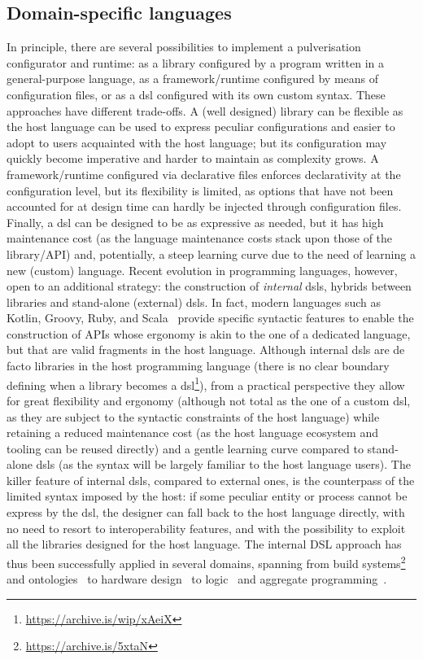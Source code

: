 \documentclass[conference]{IEEEtran}
\begin{document}
\subsection{Domain-specific languages}

In principle, there are several possibilities to implement a pulverisation configurator and runtime:
as a library
configured by a program written in a general-purpose language,
as a framework/runtime configured by means of configuration files,
or as a \ac{dsl} configured with its own custom syntax.
%
These approaches have different trade-offs.
%
A (well designed) library can be flexible as the host language can be used to express peculiar configurations
and easier to adopt to users acquainted with the host language;
but its configuration may quickly become imperative and harder to maintain as complexity grows.
%
A framework/runtime configured via declarative files enforces declarativity at the configuration level,
but its flexibility is limited,
as options that have not been accounted for at design time can hardly be injected through configuration files.
%
Finally, a \ac{dsl} can be designed to be as expressive as needed,
but it has high maintenance cost (as the language maintenance costs stack upon those of the library/API) and, potentially,
a steep learning curve due to the need of learning a new (custom) language.
%
Recent evolution in programming languages,
however,
open to an additional strategy:
the construction of \emph{internal} \acp{dsl},
hybrids between libraries and stand-alone (external) \acp{dsl}.
%
In fact, modern languages such as Kotlin, Groovy, Ruby, and Scala~\cite{Riti2018}
provide specific syntactic features to enable the construction of APIs whose ergonomy is akin to the one of a dedicated language,
but that are valid fragments in the host language.
%
Although internal \acp{dsl} are de facto libraries in the host programming language
(there is no clear boundary defining when a library becomes a \ac{dsl}\footnote{\url{https://archive.is/wip/xAeiX}}),
from a practical perspective
they allow for great flexibility and ergonomy
(although not total as the one of a custom \ac{dsl}, as they are subject to the syntactic constraints of the host language)
while retaining a reduced maintenance cost
(as the host language ecosystem and tooling can be reused directly)
and a gentle learning curve compared to stand-alone \acp{dsl}
(as the syntax will be largely familiar to the host language users).
%
The killer feature of internal \acp{dsl}, compared to external ones,
is the counterpass of the limited syntax imposed by the host:
if some peculiar entity or process cannot be express by the \ac{dsl},
the designer can fall back to the host language directly,
with no need to resort to interoperability features,
and with the possibility to exploit all the libraries designed for the host language.
%
The internal DSL approach has thus been successfully applied in several domains,
spanning from
build systems\footnote{\url{https://archive.is/5xtaN}}
and ontologies~\cite{DBLP:journals/jossw/Balhoff16} to
hardware design~\cite{DBLP:journals/trets/SerreP20} to
logic~\cite{2pkt-swx16} and aggregate programming~\cite{DBLP:journals/softx/CasadeiVAP22}.
%
\end{document}
